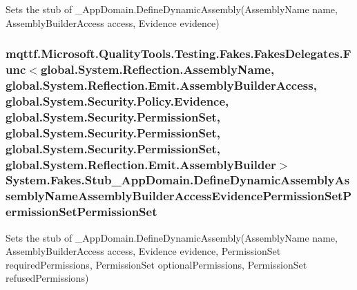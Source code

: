 Sets the stub of \-\_\-\-App\-Domain.\-Define\-Dynamic\-Assembly(\-Assembly\-Name name, Assembly\-Builder\-Access access, Evidence evidence)

\hypertarget{class_system_1_1_fakes_1_1_stub___app_domain_af19119395afcaaf1e46afb58460e968e}{
\subsubsection[{Define\-Dynamic\-Assembly\-Assembly\-Name\-Assembly\-Builder\-Access\-Evidence\-Permission\-Set\-Permission\-Set\-Permission\-Set}]{\setlength{\rightskip}{0pt plus 5cm}mqttf.\-Microsoft.\-Quality\-Tools.\-Testing.\-Fakes.\-Fakes\-Delegates.\-Func$<$global.\-System.\-Reflection.\-Assembly\-Name, global.\-System.\-Reflection.\-Emit.\-Assembly\-Builder\-Access, global.\-System.\-Security.\-Policy.\-Evidence, global.\-System.\-Security.\-Permission\-Set, global.\-System.\-Security.\-Permission\-Set, global.\-System.\-Security.\-Permission\-Set, global.\-System.\-Reflection.\-Emit.\-Assembly\-Builder$>$ System.\-Fakes.\-Stub\-\_\-\-App\-Domain.\-Define\-Dynamic\-Assembly\-Assembly\-Name\-Assembly\-Builder\-Access\-Evidence\-Permission\-Set\-Permission\-Set\-Permission\-Set}}\label{class_system_1_1_fakes_1_1_stub___app_domain_af19119395afcaaf1e46afb58460e968e}


Sets the stub of \-\_\-\-App\-Domain.\-Define\-Dynamic\-Assembly(\-Assembly\-Name name, Assembly\-Builder\-Access access, Evidence evidence, Permission\-Set required\-Permissions, Permission\-Set optional\-Permissions, Permission\-Set refused\-Permissions)

